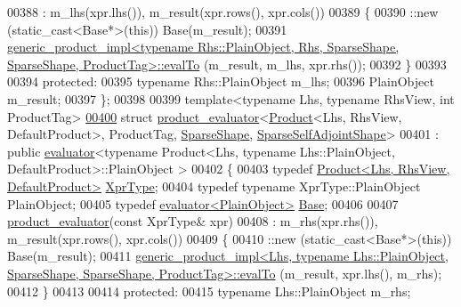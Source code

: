 \begin{DoxyCode}
00388     : m\_lhs(xpr.lhs()), m\_result(xpr.rows(), xpr.cols())
00389   \{
00390     ::new (static\_cast<Base*>(\textcolor{keyword}{this})) Base(m\_result);
00391     
      \hyperlink{struct_eigen_1_1internal_1_1generic__product__impl}{generic\_product\_impl<typename Rhs::PlainObject, Rhs, SparseShape, SparseShape, ProductTag>::evalTo}
      (m\_result, m\_lhs, xpr.rhs());
00392   \}
00393   
00394 \textcolor{keyword}{protected}:
00395   \textcolor{keyword}{typename} Rhs::PlainObject m\_lhs;
00396   PlainObject m\_result;
00397 \};
00398 
00399 \textcolor{keyword}{template}<\textcolor{keyword}{typename} Lhs, \textcolor{keyword}{typename} RhsView, \textcolor{keywordtype}{int} ProductTag>
\hyperlink{struct_eigen_1_1internal_1_1product__evaluator_3_01_product_3_01_lhs_00_01_rhs_view_00_01_defaule3daa34d3e750fc1a34e5c28fcdbf893}{00400} \textcolor{keyword}{struct }\hyperlink{struct_eigen_1_1internal_1_1product__evaluator}{product\_evaluator}<\hyperlink{group___core___module_class_eigen_1_1_product}{Product}<Lhs, RhsView, DefaultProduct>, ProductTag, 
      \hyperlink{struct_eigen_1_1_sparse_shape}{SparseShape}, \hyperlink{struct_eigen_1_1internal_1_1_sparse_self_adjoint_shape}{SparseSelfAdjointShape}>
00401   : \textcolor{keyword}{public} \hyperlink{struct_eigen_1_1internal_1_1evaluator}{evaluator}<typename Product<Lhs, typename Lhs::PlainObject, DefaultProduct>::PlainObject
      >
00402 \{
00403   \textcolor{keyword}{typedef} \hyperlink{group___core___module_class_eigen_1_1_product}{Product<Lhs, RhsView, DefaultProduct>} 
      \hyperlink{group___core___module_class_eigen_1_1_product}{XprType};
00404   \textcolor{keyword}{typedef} \textcolor{keyword}{typename} XprType::PlainObject PlainObject;
00405   \textcolor{keyword}{typedef} \hyperlink{struct_eigen_1_1internal_1_1evaluator}{evaluator<PlainObject>} \hyperlink{struct_eigen_1_1internal_1_1evaluator}{Base};
00406 
00407   \hyperlink{struct_eigen_1_1internal_1_1product__evaluator}{product\_evaluator}(\textcolor{keyword}{const} XprType& xpr)
00408     : m\_rhs(xpr.rhs()), m\_result(xpr.rows(), xpr.cols())
00409   \{
00410     ::new (static\_cast<Base*>(\textcolor{keyword}{this})) Base(m\_result);
00411     
      \hyperlink{struct_eigen_1_1internal_1_1generic__product__impl}{generic\_product\_impl<Lhs, typename Lhs::PlainObject, SparseShape, SparseShape, ProductTag>::evalTo}
      (m\_result, xpr.lhs(), m\_rhs);
00412   \}
00413   
00414 \textcolor{keyword}{protected}:
00415   \textcolor{keyword}{typename} Lhs::PlainObject m\_rhs;

\end{DoxyCode}
